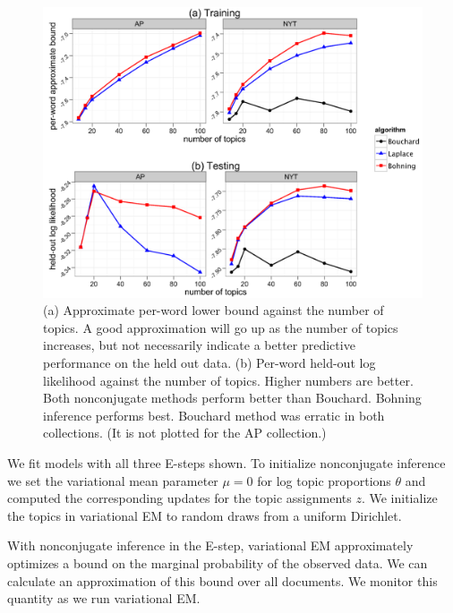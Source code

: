 \begin{figure}
  \centering
    \hspace*{-1.5cm}\includegraphics[height=0.40\textheight]{./Chap2/plots/figs/fig1-all-3.png}
  \caption{(a) Approximate per-word lower bound against the number of topics. A good approximation will go up as the number of topics increases, but not necessarily indicate a better predictive performance on the held out data. (b) Per-word held-out log likelihood against the number of topics. Higher numbers are better. Both nonconjugate methods perform better than Bouchard. Bohning inference performs best. Bouchard method was erratic in both collections. (It is not plotted for the AP collection.)}
  \label{fig:chap2-fig-all-3}
\end{figure}

We fit models with all three E-steps shown. To initialize nonconjugate inference we set the variational mean parameter $\mu = 0$ for log topic proportions $\theta$ and computed the corresponding updates for the topic assignments $z$. We initialize the topics in variational EM to random draws from a uniform Dirichlet.

With nonconjugate inference in the E-step, variational EM approximately optimizes a bound on the marginal probability of the observed data. We can calculate an approximation of this bound over all documents. We monitor this quantity as we run variational EM.

